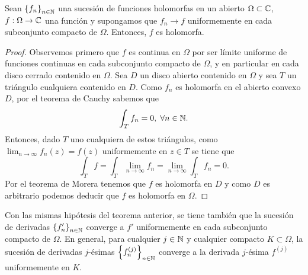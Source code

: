 \begin{theorem}
	Sean $\displaystyle \left\{ f_{n}\right\} _{n\in\mathbb{N}} $ una sucesión de funciones holomorfas en un abierto $\displaystyle \Omega \subset \mathbb{C} $, $\displaystyle f : \Omega \to \mathbb{C} $ una función y supongamos que $\displaystyle f_{n} \to f $ uniformemente en cada subconjunto compacto de $\displaystyle \Omega  $. Entonces, $\displaystyle f $ es holomorfa. 
\end{theorem}
\begin{proof}
Observemos primero que $\displaystyle f $ es continua en $\displaystyle \Omega  $ por ser límite uniforme de funciones continuas en cada subconjunto compacto de $\displaystyle \Omega  $, y en particular en cada disco cerrado contenido en $\displaystyle \Omega  $. Sea $\displaystyle D $ un disco abierto contenido en $\displaystyle \Omega  $ y sea $\displaystyle T $ un triángulo cualquiera contenido en $\displaystyle D $. Como $\displaystyle f_{n} $ es holomorfa en el abierto convexo $\displaystyle D $, por el teorema de Cauchy sabemos que 
\[\int _{T}f_{n} = 0 , \; \forall n \in \mathbb{N} .\]
Entonces, dado $\displaystyle T $ uno cualquiera de estos triángulos, como $\displaystyle \lim_{n \to \infty }f_{n}\left(z\right)=f\left(z\right) $ uniformemente en $\displaystyle z\in T $ se tiene que 
\[\int _{T}f =\int _{T}\lim_{n \to \infty}f_{n} =\lim_{n \to \infty}\int _{T}f_{n} =0 .\]
Por el teorema de Morera tenemos que $\displaystyle f $ es holomorfa en $\displaystyle D $ y como $\displaystyle D $ es arbitrario podemos deducir que $\displaystyle f $ es holomorfa en $\displaystyle \Omega  $. 
\end{proof}
\begin{theorem}
	Con las mismas hipótesis del teorema anterior, se tiene también que la sucesión de derivadas $\displaystyle \left\{ f'_{n}\right\} _{n\in\mathbb{N}} $ converge a $\displaystyle f' $ uniformemente en cada subconjunto compacto de $\displaystyle \Omega  $. En general, para cualquier $\displaystyle j \in \mathbb{N} $ y cualquier compacto $\displaystyle K \subset \Omega  $, la sucesión de derivadas $\displaystyle j $-ésimas $\displaystyle \left\{ f_{n}^{\left(j\right)}\right\} _{n\in\mathbb{N}} $ converge a la derivada $\displaystyle j $-ésima $\displaystyle f^{\left(j\right)} $ uniformemente en $\displaystyle K $.
\end{theorem}
